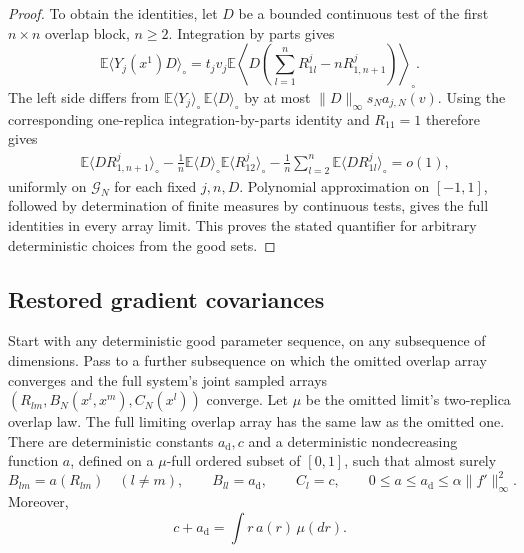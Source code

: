 \begin{proof}
To obtain the identities, let $D$ be a bounded continuous test of the
first $n\times n$ overlap block, $n\ge2$.  Integration by parts gives
\[
 \mathbb E\langle Y_j(x^1)D\rangle_\circ
 =t_jv_j\mathbb E\left\langle D\left(
       \sum_{l=1}^nR_{1l}^j-nR_{1,n+1}^j\right)\right\rangle_\circ.
\]
The left side differs from
$\mathbb E\langle Y_j\rangle_\circ\,\mathbb E\langle D\rangle_\circ$
by at most $\|D\|_\infty s_Na_{j,N}(v)$.  Using the corresponding
one-replica integration-by-parts identity and $R_{11}=1$ therefore gives
\begin{align*}
 &\mathbb E\langle D R_{1,n+1}^j\rangle_\circ
 -\frac1n\mathbb E\langle D\rangle_\circ
             \mathbb E\langle R_{12}^j\rangle_\circ
 -\frac1n\sum_{l=2}^n\mathbb E\langle D R_{1l}^j\rangle_\circ
 =o(1),
\end{align*}
uniformly on $\mathcal G_N$ for each fixed $j,n,D$.  Polynomial
approximation on $[-1,1]$, followed by determination of finite measures
by continuous tests, gives the full identities in every array limit.
This proves the stated quantifier for arbitrary deterministic choices
from the good sets.
\end{proof}

\subsection{Restored gradient covariances}

\begin{proposition}
\label{bulk:restoration}
Start with any deterministic good parameter sequence, on any subsequence
of dimensions.  Pass to a further subsequence on which the omitted
overlap array converges and the full system's joint sampled arrays
$(R_{lm},B_N(x^l,x^m),C_N(x^l))$ converge.  Let $\mu$ be the omitted
limit's two-replica overlap law.  The full limiting overlap array has the
same law as the omitted one.  There are deterministic constants
$a_{\mathrm d},c$ and a deterministic nondecreasing function $a$, defined
on a $\mu$-full ordered subset of $[0,1]$, such that almost surely
\begin{equation}\label{bulk:deterministic-covariances}
 B_{lm}=a(R_{lm})\quad(l\ne m),\qquad
 B_{ll}=a_{\mathrm d},\qquad C_l=c,
 \qquad 0\le a\le a_{\mathrm d}\le\alpha\|f'\|_\infty^2.
\end{equation}
Moreover,
\begin{equation}\label{bulk:ibp-balance}
 c+a_{\mathrm d}=\int r\,a(r)\,\mu(dr).
\end{equation}
\end{proposition}

